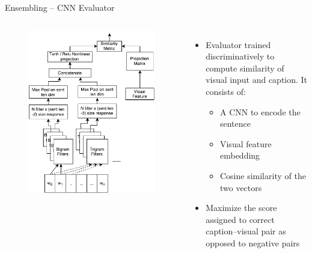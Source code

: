 \documentclass{beamer}
\begin{document}
\begin{frame}{Ensembling -- CNN Evaluator}
\begin{columns}       
    \begin{figure}[h]
        \centering
        \includegraphics[width=1.0\textwidth]{images/CnnEval.pdf}
        \vfill
    \end{figure}
    \begin{itemize}
        \item Evaluator trained discriminatively to compute similarity of visual input and caption. It consists of: 
           \begin{itemize}
               \item A CNN to encode the sentence 
               \item Visual feature embedding
               \item Cosine similarity of the two vectors 
           \end{itemize}
        \item Maximize the score assigned to correct caption--visual pair as opposed to negative pairs 
    \end{itemize}
\end{columns}
\end{frame}
\end{document}
